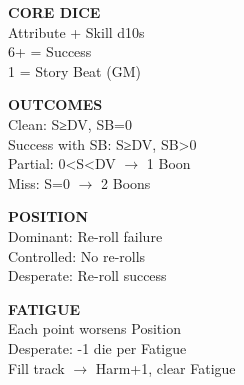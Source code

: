 \documentclass[11pt]{article}
\begin{document}
\begin{Form}
\begin{tcolorbox}[colback=fe-silk!20, colframe=fe-dusk, boxrule=0.5pt, sharp corners, width=\linewidth, breakable]
    \begin{minipage}[t]{0.22\linewidth}
        {\bfseries\color{fe-dusk} CORE DICE}\\
        {\small Attribute + Skill d10s}\\
        {\small 6+ = Success}\\
        {\small 1 = Story Beat (GM)}
    \end{minipage}
    \hfill
    \begin{minipage}[t]{0.25\linewidth}
        {\bfseries\color{fe-dusk} OUTCOMES}\\
        {\small Clean: S≥DV, SB=0}\\
        {\small Success with SB: S≥DV, SB>0}\\
        {\small Partial: 0<S<DV $\rightarrow$ 1 Boon}\\
        {\small Miss: S=0 $\rightarrow$ 2 Boons}
    \end{minipage}
    \hfill
    \begin{minipage}[t]{0.25\linewidth}
        {\bfseries\color{fe-dusk} POSITION}\\
        {\small Dominant: Re-roll failure}\\
        {\small Controlled: No re-rolls}\\
        {\small Desperate: Re-roll success}
    \end{minipage}
    \hfill
    \begin{minipage}[t]{0.22\linewidth}
        {\bfseries\color{fe-dusk} FATIGUE}\\
        {\small Each point worsens Position}\\
        {\small Desperate: -1 die per Fatigue}\\
        {\small Fill track $\rightarrow$ Harm+1, clear Fatigue}
    \end{minipage}
\end{tcolorbox}

\vspace{0.2cm}
\begin{center}
    \PushButton[name=calcBtn, onclick={this.calcResources();}, borderwidth=1pt, bordercolor=fe-dusk, backgroundcolor=fe-dusk, color=white, width=4cm, height=0.6cm]{\textbf{\textcolor{white}{Calculate Obligation Capacity}}}
    \quad
    \PushButton[name=resetBtn, onclick={this.resetAll();}, borderwidth=1pt, bordercolor=fe-blood, backgroundcolor=fe-blood, color=white, width=4cm, height=0.6cm]{\textbf{\textcolor{white}{Reset All}}}
\end{center}


\end{Form}
\end{document}
